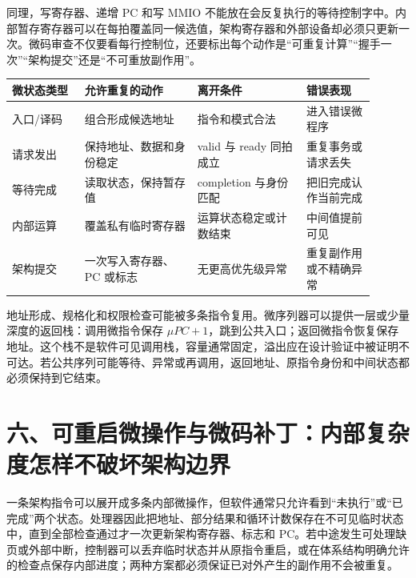 同理，写寄存器、递增 PC 和写 MMIO 不能放在会反复执行的等待控制字中。内部暂存寄存器可以在每拍覆盖同一候选值，架构寄存器和外部设备却必须只更新一次。微码审查不仅要看每行控制位，还要标出每个动作是“可重复计算”“握手一次”“架构提交”还是“不可重放副作用”。

\begin{longtable}{L{0.18\linewidth}L{0.28\linewidth}L{0.27\linewidth}L{0.17\linewidth}}
\toprule
微状态类型 & 允许重复的动作 & 离开条件 & 错误表现 \\
\midrule
入口/译码 & 组合形成候选地址 & 指令和模式合法 & 进入错误微程序 \\\tablerowrule
请求发出 & 保持地址、数据和身份稳定 & valid 与 ready 同拍成立 & 重复事务或请求丢失 \\\tablerowrule
等待完成 & 读取状态，保持暂存值 & completion 与身份匹配 & 把旧完成认作当前完成 \\\tablerowrule
内部运算 & 覆盖私有临时寄存器 & 运算状态稳定或计数结束 & 中间值提前可见 \\\tablerowrule
架构提交 & 一次写入寄存器、PC 或标志 & 无更高优先级异常 & 重复副作用或不精确异常 \\
\bottomrule
\end{longtable}


地址形成、规格化和权限检查可能被多条指令复用。微序列器可以提供一层或少量深度的返回栈：调用微指令保存 \(\mu PC+1\)，跳到公共入口；返回微指令恢复保存地址。这个栈不是软件可见调用栈，容量通常固定，溢出应在设计验证中被证明不可达。若公共序列可能等待、异常或再调用，返回地址、原指令身份和中间状态都必须保持到它结束。

\section{六、可重启微操作与微码补丁：内部复杂度怎样不破坏架构边界}

一条架构指令可以展开成多条内部微操作，但软件通常只允许看到“未执行”或“已完成”两个状态。处理器因此把地址、部分结果和循环计数保存在不可见临时状态中，直到全部检查通过才一次更新架构寄存器、标志和 PC。若中途发生可处理缺页或外部中断，控制器可以丢弃临时状态并从原指令重启，或在体系结构明确允许的检查点保存内部进度；两种方案都必须保证已对外产生的副作用不会被重复。

